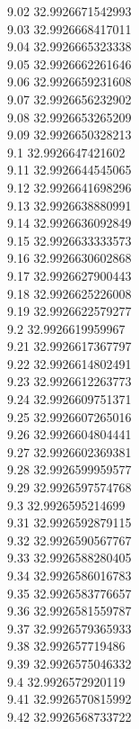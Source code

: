 {9.02	32.9926671542993\\
9.03	32.9926668417011\\
9.04	32.9926665323338\\
9.05	32.9926662261646\\
9.06	32.9926659231608\\
9.07	32.9926656232902\\
9.08	32.9926653265209\\
9.09	32.9926650328213\\
9.1	32.9926647421602\\
9.11	32.9926644545065\\
9.12	32.9926641698296\\
9.13	32.9926638880991\\
9.14	32.9926636092849\\
9.15	32.9926633333573\\
9.16	32.9926630602868\\
9.17	32.9926627900443\\
9.18	32.9926625226008\\
9.19	32.9926622579277\\
9.2	32.9926619959967\\
9.21	32.9926617367797\\
9.22	32.9926614802491\\
9.23	32.9926612263773\\
9.24	32.9926609751371\\
9.25	32.9926607265016\\
9.26	32.9926604804441\\
9.27	32.9926602369381\\
9.28	32.9926599959577\\
9.29	32.9926597574768\\
9.3	32.9926595214699\\
9.31	32.9926592879115\\
9.32	32.9926590567767\\
9.33	32.9926588280405\\
9.34	32.9926586016783\\
9.35	32.9926583776657\\
9.36	32.9926581559787\\
9.37	32.9926579365933\\
9.38	32.992657719486\\
9.39	32.9926575046332\\
9.4	32.9926572920119\\
9.41	32.9926570815992\\
9.42	32.9926568733722\\
}
